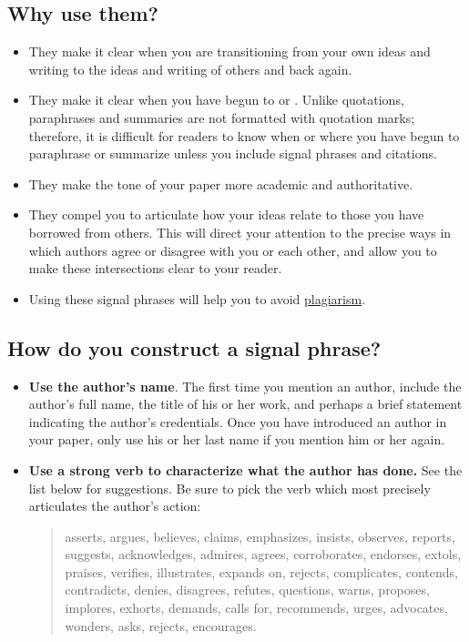 \subsection{Why use them?}
 \begin{itemize}

\item They make it clear when you are transitioning from your own ideas and
writing to the ideas and writing of others and back again.

\item They make it clear when you have begun to \hyperlink{paraphrase}{\color{Ahrenge}{paraphrase}} or \hyperlink{summary}{\color{Ahrenge}{summarize}}.
Unlike quotations, paraphrases and summaries are not formatted with quotation
marks; therefore, it is difficult for readers to know when or where you have
begun to paraphrase or summarize unless you include signal phrases and citations.

\item They make the tone of your paper more academic and authoritative.

\item They compel you to articulate how your ideas relate to those you
have borrowed from others. This will direct your attention to the precise
ways in which authors agree or disagree with you or each other, and allow
you to make these intersections clear to your reader.

\item Using these signal phrases will help you to avoid \hyperlink{plagiarism}{\color{Ahrenge}plagiarism}.
 \end{itemize}

\subsection{How do you construct a signal phrase?}

\begin{itemize}
\item \textbf{Use the author's name}. The first time you mention an author,
include the
author's full name, the title of his or her work, and perhaps a brief
statement indicating the
author's credentials. Once you have introduced an author in your paper,
only use his or
her last name if you mention him or her again.

\item \textbf{Use a strong verb to characterize what the author has done.} See the list
below for suggestions. Be sure to pick the verb which most precisely
articulates the
author's action:

\begin{quote}
asserts, argues, believes, claims, emphasizes, insists, observes, reports,
suggests, acknowledges, admires, agrees, corroborates, endorses, extols,
praises, verifies, illustrates, expands on, rejects, complicates, contends, contradicts,
denies, disagrees, refutes, questions, warns, proposes, implores, exhorts, demands,
calls for, recommends, urges, advocates, wonders, asks, rejects, encourages.
\end{quote}

\end{itemize}

